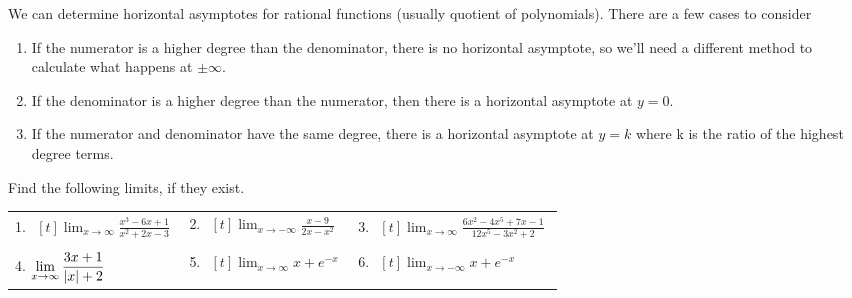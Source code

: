 We can determine horizontal asymptotes for rational functions (usually quotient of polynomials).
There are a few cases to consider
\begin{enumerate}
	\item If the numerator is a higher degree than the denominator, there is no horizontal asymptote, so we'll need a different method to calculate what happens at $\pm\infty$.
	\item If the denominator is a higher degree than the numerator, then there is a horizontal asymptote at $y = 0$.
	\item If the numerator and denominator have the same degree, there is a horizontal asymptote at $y = k$ where k is the ratio of the highest degree terms.
\end{enumerate}

\begin{example}
	Find the following limits, if they exist.\\
	\begin{table}[H]
	\begin{center}
	\begin{tabular}{ l l l}
		1. $\begin{aligned}[t]
			\lim_{x \to \infty}{\frac{x^3 - 6x + 1}{x^2 + 2x - 3}}
		\end{aligned}$ & 
		2. $\begin{aligned}[t]
			\lim_{x\to -\infty}{\frac{x-9}{2x-x^2}}
		\end{aligned}$ &
		3. $\begin{aligned}[t]
			\lim_{x\to \infty}{\frac{6x^2-4x^5+7x-1}{12x^5-3x^2+2}}
		\end{aligned}$ \\
		\hspace{1pt} & \hspace{1pt}\\
		4. $\begin{aligned}[t]
			\lim_{x\to \infty}{\frac{3x+1}{\lvert x \rvert+2}}
		\end{aligned}$ &
		5. $\begin{aligned}[t]
			\lim_{x \to \infty}{x + e^{-x}}
		\end{aligned}$ &
		6. $\begin{aligned}[t]
			\lim_{x \to -\infty}{x + e^{-x}}
		\end{aligned}$
	\end{tabular}
	\end{center}
	\end{table}
\end{example}
